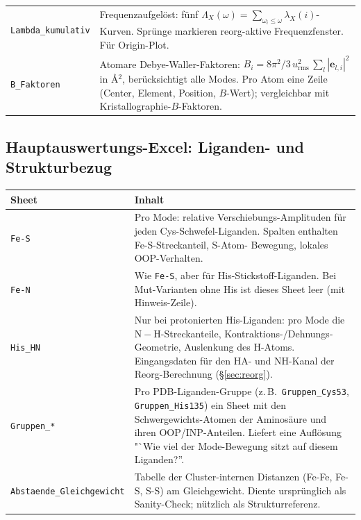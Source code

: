 \documentclass[11pt,a4paper,twoside]{article}
\newcommand{\evec}{\mathbf{e}}
\newcommand{\urms}{u_{\mathrm{rms}}}
\theoremstyle{remark}
\begin{document}
\begin{longtable}{p{} p{}}
\texttt{Lambda\_kumulativ} & Frequenzaufgel\"ost: f\"unf
  $\Lambda_X(\omega) = \sum_{\omega_i \le \omega} \lambda_X(i)$-Kurven.
  Spr\"unge markieren reorg-aktive Frequenzfenster. F\"ur Origin-Plot. \\

\texttt{B\_Faktoren} & Atomare Debye-Waller-Faktoren: $B_i = 8\pi^2/3 \,
  \urms^2 \, \sum_l |\evec_{l,i}|^2$ in \AA{}$^2$, ber\"ucksichtigt alle
  Modes. Pro Atom eine Zeile (Center, Element, Position, $B$-Wert);
  vergleichbar mit Kristallographie-$B$-Faktoren. \\
\bottomrule
\end{longtable}

\subsection{Hauptauswertungs-Excel: Liganden- und Strukturbezug}

\begin{longtable}{p{} p{}}
\toprule
\textbf{Sheet} & \textbf{Inhalt} \\
\midrule
\endhead

\texttt{Fe-S} & Pro Mode: relative Verschiebungs-Amplituden f\"ur jeden
  Cys-Schwefel-Liganden. Spalten enthalten Fe-S-Streckanteil, S-Atom-
  Bewegung, lokales OOP-Verhalten. \\

\texttt{Fe-N} & Wie \texttt{Fe-S}, aber f\"ur His-Stickstoff-Liganden.
  Bei Mut-Varianten ohne His ist dieses Sheet leer (mit
  Hinweis-Zeile). \\

\texttt{His\_HN} & Nur bei protonierten His-Liganden: pro Mode die
  $\mathrm{N}-\mathrm{H}$-Streckanteile, Kontraktions-/Dehnungs-
  Geometrie, Auslenkung des H-Atoms. Eingangsdaten f\"ur den
  HA- und NH-Kanal der Reorg-Berechnung
  (\S\ref{sec:reorg}). \\

\texttt{Gruppen\_*} & Pro PDB-Liganden-Gruppe (z.\,B.\
  \texttt{Gruppen\_Cys53}, \texttt{Gruppen\_His135}) ein Sheet mit den
  Schwergewichts-Atomen der Aminos\"aure und ihren OOP/INP-Anteilen.
  Liefert eine Aufl\"osung "`Wie viel der Mode-Bewegung sitzt auf
  diesem Liganden?''. \\

\texttt{Abstaende\_Gleichgewicht} & Tabelle der Cluster-internen
  Distanzen (Fe-Fe, Fe-S, S-S) am Gleichgewicht. Diente urspr\"unglich
  als Sanity-Check; n\"utzlich als Strukturreferenz. \\
\bottomrule
\end{longtable}
\end{document}
